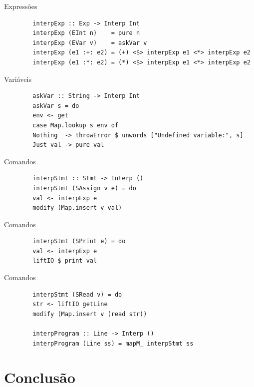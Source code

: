 \begin{frame}[fragile]{Expressões}

    \begin{lstlisting}
        interpExp :: Exp -> Interp Int
        interpExp (EInt n)    = pure n
        interpExp (EVar v)    = askVar v
        interpExp (e1 :+: e2) = (+) <$> interpExp e1 <*> interpExp e2
        interpExp (e1 :*: e2) = (*) <$> interpExp e1 <*> interpExp e2
    \end{lstlisting}
\end{frame}

\begin{frame}[fragile]{Variáveis}

    \begin{lstlisting}
        askVar :: String -> Interp Int
        askVar s = do
        env <- get
        case Map.lookup s env of
        Nothing  -> throwError $ unwords ["Undefined variable:", s]
        Just val -> pure val
    \end{lstlisting}
\end{frame}

\begin{frame}[fragile]{Comandos}

    \begin{lstlisting}
        interpStmt :: Stmt -> Interp ()
        interpStmt (SAssign v e) = do
        val <- interpExp e
        modify (Map.insert v val)
    \end{lstlisting}
\end{frame}

\begin{frame}[fragile]{Comandos}

    \begin{lstlisting}
        interpStmt (SPrint e) = do
        val <- interpExp e
        liftIO $ print val
    \end{lstlisting}
\end{frame}

\begin{frame}[fragile]{Comandos}

    \begin{lstlisting}
        interpStmt (SRead v) = do
        str <- liftIO getLine
        modify (Map.insert v (read str))

        interpProgram :: Line -> Interp ()
        interpProgram (Line ss) = mapM_ interpStmt ss
    \end{lstlisting}
\end{frame}


\section{Conclusão}\label{conclusuxe3o}

